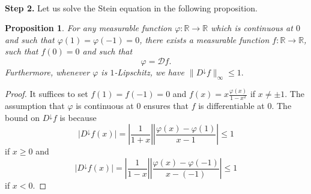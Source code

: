 \documentclass[10pt, reqno]{amsart}
\numberwithin{equation}{section}
\theoremstyle{definition}
\theoremstyle{plain}
\newtheorem{proposition}[definition]{Proposition}
\theoremstyle{remark}
\newcommand{\1}{\mathbbm{1}}
\begin{document}
$ $

\noindent \textbf{Step 2.} Let us solve the Stein equation in the following proposition.
\begin{proposition}For any measurable function $\varphi:\mathbb{R}\to \mathbb{R}$ which is continuous at $0$ and such that $\varphi(1)=\varphi(-1)=0$, there exists a measurable function $f:\mathbb{R}\to \mathbb{R}$, such that $f(0)=0$ and such that
$$\varphi=\mathcal{D}f.$$ 
Furthermore, whenever $\varphi$ is $1$-Lipschitz, we have
 $\|D^\downarrow f\|_\infty\leq 1.$
\end{proposition}
\begin{proof}It suffices to set $f(1)=f(-1)=0$ and $f(x)=x\frac{\varphi(x)}{1-x^2}$ if $x\neq \pm 1$. The assumption that 
$\varphi$ is continuous at $0$ ensures that 
$f$ is differentiable at 
$0$. The bound on $D^\downarrow f$ is because  $$|D^\downarrow f(x)|=\left|\frac{1}{1+x}\right|\left|\frac{\varphi(x)-\varphi(1)}{x-1}\right|\leq 1$$
if $x\geq 0$ and
$$|D^\downarrow f(x)|=\left|\frac{1}{1-x}\right|\left|\frac{\varphi(x)-\varphi(-1)}{x-(-1)}\right|\leq 1$$
if $x< 0$.
\end{proof}

$ $
\end{document}
